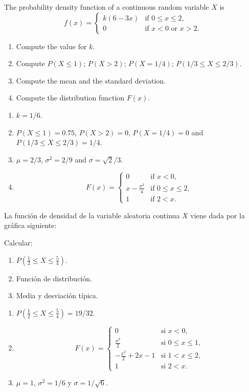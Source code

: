 
{The probability density function of a continuous random variable $X$ is
\[
f(x)=
\begin{cases}
k(6-3x) & \mbox{if $0\leq x\leq 2$,} \\
0 & \mbox{if  $x<0$ or $x>2$.}
\end{cases}
\]
\begin{enumerate}
\item Compute the value for $k$.
\item Compute $P(X\leq 1)$; $P(X>2)$; $P(X=1/4)$; $P(1/3\leq X\leq 2/3)$.
\item Compute the mean and the standard deviation.
\item Compute the distribution function $F(x)$.
\end{enumerate}
}
{
\begin{enumerate}
\item $k=1/6$.
\item $P(X\leq 1)=0.75$, $P(X>2)=0$, $P(X=1/4)=0$ and $P(1/3\leq X\leq 2/3)=1/4$.
\item $\mu=2/3$, $\sigma^2=2/9$ and $\sigma=\sqrt{2}/3$.
\item \[
F(x)=
\begin{cases}
0 & \text{if $x<0$,}\\
x-\frac{x^2}{4} & \mbox{if $0\leq x\leq 2$,}\\
1 & \text{if $2<x$.}
\end{cases}
\]
\end{enumerate}
}
{}


{La función de densidad de la variable aleatoria continua $X$ viene dada por la gráfica siguiente:
\begin{center}
\scalebox{0.6}{}
\end{center}
Calcular:
\begin{enumerate}
\item $P(\frac{1}{2}\leq X\leq \frac{5}{4})$.
\item Función de distribución.
\item Media y desviación típica.
\end{enumerate}
}
{
\begin{enumerate}
\item $P(\frac{1}{2}\leq X\leq \frac{5}{4})=19/32$.
\item \[
F(x)=
\begin{cases}
0 & \text{si $x<0$,}\\
\frac{x^2}{2} & \text{si $0\leq x\leq 1$,}\\
-\frac{x^2}{2}+2x-1 & \text{si $1<x\leq 2$,}\\
1 & \text{si $2<x$.}
\end{cases}
\]
\item $\mu=1$, $\sigma^2=1/6$ y $\sigma=1/\sqrt{6}$.
\end{enumerate}
}
{}


